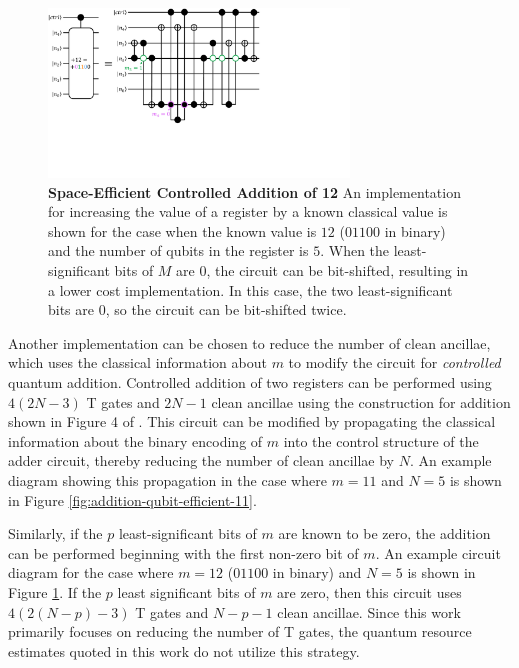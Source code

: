 \begin{figure}
    \centering
    \includegraphics[width=8cm]{figures/ctrl-add-12-qubit-efficient.pdf}
    \caption{
        \textbf{Space-Efficient Controlled Addition of 12} 
        An implementation for increasing the value of a register by a known classical value is shown for the case when the known value is $12$ ($01100$ in binary) and the number of qubits in the register is $5$.
        When the least-significant bits of $M$ are $0$, the circuit can be bit-shifted, resulting in a lower cost implementation.
        In this case, the two least-significant bits are $0$, so the circuit can be bit-shifted twice.
    }
    \label{fig:addition-qubit-efficient-12}
\end{figure}

Another implementation can be chosen to reduce the number of clean ancillae, which uses the classical information about $m$ to modify the circuit for \textit{controlled} quantum addition.
Controlled addition of two registers can be performed using $4(2N - 3)$ T gates and $2N - 1$ clean ancillae using the construction for addition shown in Figure 4 of \cite{gidney2018halving}.
This circuit can be modified by propagating the classical information about the binary encoding of $m$ into the control structure of the adder circuit, thereby reducing the number of clean ancillae by $N$.
An example diagram showing this propagation in the case where $m = 11$ and $N = 5$ is shown in Figure \ref{fig:addition-qubit-efficient-11}.

Similarly, if the $p$ least-significant bits of $m$ are known to be zero, the addition can be performed beginning with the first non-zero bit of $m$.
An example circuit diagram for the case where $m=12$ ($01100$ in binary) and $N = 5$ is shown in Figure \ref{fig:addition-qubit-efficient-12}.
If the $p$ least significant bits of $m$ are zero, then this circuit uses $4(2(N - p) - 3)$ T gates and $N - p - 1$ clean ancillae.
Since this work primarily focuses on reducing the number of T gates, the quantum resource estimates quoted in this work do not utilize this strategy.
